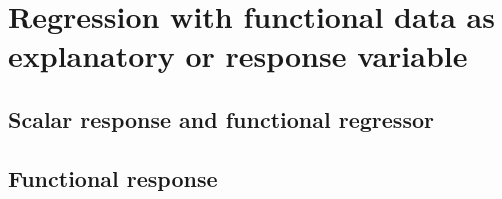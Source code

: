 \chapter{Regression with functional data as explanatory or response variable}

\section{Scalar response and functional regressor}
\section{Functional response}
